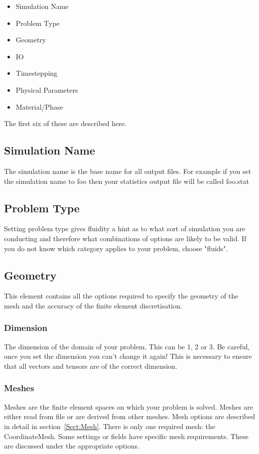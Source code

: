 \begin{itemize}
\item Simulation Name
\item Problem Type
\item Geometry
\item IO
\item Timestepping
\item Physical Parameters
\item Material/Phase
\end{itemize}

The first six of these are described here.

\subsection{Simulation Name}
The simulation name is the base name for all output files. For example if you set the simulation name to foo then your statistics output file will be called foo.stat

\subsection{Problem Type}
Setting problem type gives fluidity a hint as to what sort of simulation you are conducting and therefore what combinations of options are likely to be valid. If you do not know which category applies to your problem, choose "fluids". 
\subsection{Geometry}
This element contains all the options required to specify the geometry of the mesh and the accuracy of the finite element discretisation.

\subsubsection{Dimension}
The dimension of the domain of your problem. This can be 1, 2 or 3.
Be careful, once you set the dimension you can't change it again!
This is necessary to ensure that all vectors and tensors are of the correct
dimension.

\subsubsection{Meshes}
Meshes are the finite element spaces on which your problem is solved. Meshes
are either read from file or are derived from other meshes. Mesh options are
described in detail in section~\ref{Sect:Mesh}.  There is only one required
mesh: the CoordinateMesh. Some settings or fields have
specific mesh requirements. These are discussed under the appropriate
options.

